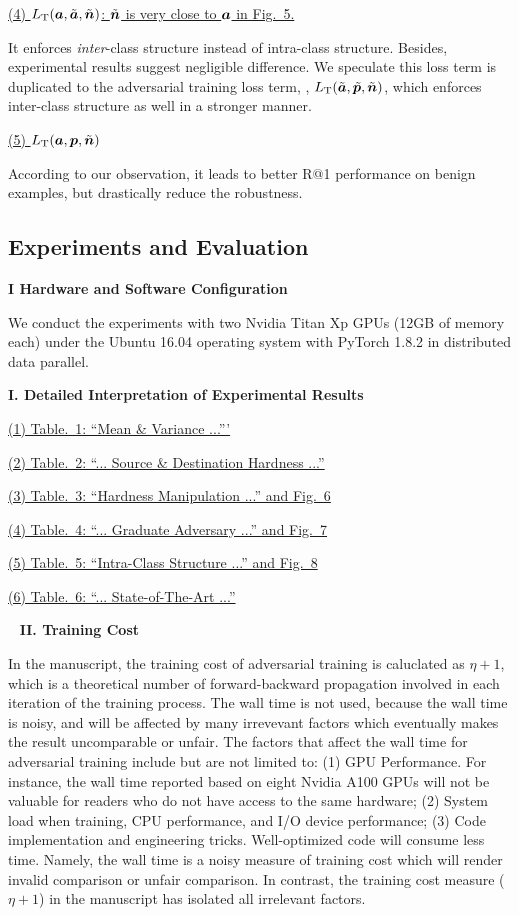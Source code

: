 \ul{(4) $L_\text{T}({\bm{a}}, \tilde{{\bm{a}}}, \tilde{{\bm{n}}})$: $\tilde{{\bm{n}}}$ is very close to ${\bm{a}}$ in Fig.~5.}

It enforces \emph{inter}-class structure instead of intra-class structure.
%
Besides, experimental results suggest negligible difference.
%
We speculate this loss term is duplicated to the adversarial training loss term,
\ie, $L_\text{T}(\tilde{{\bm{a}}}, \tilde{{\bm{p}}}, \tilde{{\bm{n}}})$, which enforces
inter-class structure as well in a stronger manner.

\ul{(5) $L_\text{T}({\bm{a}}, {\bm{p}}, \tilde{{\bm{n}}})$}

According to our observation, it leads to better R@1 performance on benign
examples, but drastically reduce the robustness.

\subsection{Experiments and Evaluation}

\noindent\textbf{I Hardware and Software Configuration}

We conduct the experiments with two Nvidia Titan Xp GPUs (12GB of memory each)
under the Ubuntu 16.04 operating system with PyTorch 1.8.2 in distributed data
parallel.

\noindent\textbf{I. Detailed Interpretation of Experimental Results}

\ul{(1) Table.~1: ``Mean \& Variance ...'''}

\ul{(2) Table.~2: ``... Source \& Destination Hardness ...''}

\ul{(3) Table.~3: ``Hardness Manipulation ...'' and Fig.~6}

\ul{(4) Table.~4: ``... Graduate Adversary ...'' and Fig.~7}

\ul{(5) Table.~5: ``Intra-Class Structure ...'' and Fig.~8}

\ul{(6) Table.~6: ``... State-of-The-Art ...''}


~\newline
\noindent\textbf{II. Training Cost}

In the manuscript, the training cost of adversarial training is caluclated as
$\eta+1$, which is a theoretical number of forward-backward propagation
involved in each iteration of the training process.
%
The wall time is not used, because the wall time is noisy, and will be affected
by many irrevevant factors which eventually makes the result uncomparable or
unfair.
%
The factors that affect the wall time for adversarial training include but are
not limited to:
%
(1) GPU Performance. For instance, the wall time reported based on eight Nvidia
A100 GPUs will not be valuable for readers who do not have access to the same
hardware;
%
(2) System load when training, CPU performance, and I/O device performance;
%
(3) Code implementation and engineering tricks. Well-optimized code will
consume less time.
%
Namely, the wall time is a noisy measure of training cost which will render
invalid comparison or unfair comparison.
%
In contrast, the training cost measure ($\eta+1$) in the manuscript has
isolated all irrelevant factors.

